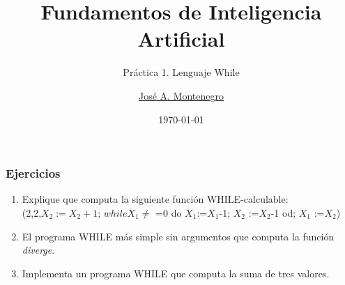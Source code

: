 \documentclass[xcolor=table]{beamer}
\title{Fundamentos de Inteligencia Artificial}
\subtitle{Práctica 1. Lenguaje While}
\author{\href{mailto:jmmontes@uma.es}{José A. Montenegro}}
\date{\today}
\begin{document}
\newtheorem{mydef}{Definición}[section] %
\maketitle




\small







\begin{frame} \frametitle{Ejercicios} 




\begin{enumerate}
    \item Explique que computa la siguiente función WHILE-calculable: \\

(2,2,$X_2 :=X_2+1$; $while X_1 \neq$ =0 do $X_1$:=$X_1$-1; $X_2$ :=$X_2$-1 od; $X_1$ :=$X_2$)

\item El programa  WHILE más simple sin argumentos que computa la función   \textit{diverge}.
 
\item Implementa un programa WHILE que computa la suma de tres valores.


\end{enumerate}


\end{frame} 
\end{document}
